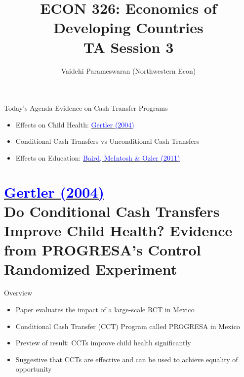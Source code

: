 \documentclass[11pt,notes=hide,aspectratio=169,mathserif]{beamer}
\title[class]{ECON 326: Economics of Developing Countries \\ TA Session 3}
\author[vaidehi's class ]{Vaidehi Parameswaran (Northwestern Econ)}
\date{\monthname[\the\month] \the\year}
\begin{document}
\begin{frame}[plain]
\titlepage
\end{frame}


\begin{frame}{Today's Agenda}
Evidence on Cash Transfer Programs
\begin{itemize}
\item Effects on Child Health: \href{https://www.aeaweb.org/articles?id=10.1257/0002828041302109}{\textcolor{blue}{Gertler (2004)}}
\item Conditional Cash Transfers vs Unconditional Cash Transfers
\item Effects on Education: \href{https://academic.oup.com/qje/article-abstract/126/4/1709/1922509?login=false}{\textcolor{blue}{Baird, McIntosh \& Ozler (2011)}}
\end{itemize}
\end{frame}



\section*{\href{https://www.aeaweb.org/articles?id=10.1257/0002828041302109}{\textcolor{blue}{Gertler (2004)}} \\[5mm] 
\textnormal{\small{Do Conditional Cash Transfers Improve Child Health? Evidence from PROGRESA's Control Randomized Experiment}}}

\begin{frame}{Overview}
\begin{itemize}
\item Paper evaluates the impact of a large-scale RCT in Mexico 
\pause \item Conditional Cash Transfer (CCT) Program called PROGRESA in Mexico
\item Preview of result: \pause CCTs improve child health significantly 
\pause \item Suggestive that CCTs are effective and can be used to achieve equality of opportunity 
\end{itemize}
\end{frame}
\end{document}
